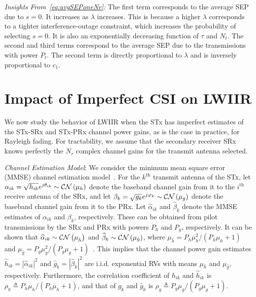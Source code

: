 \documentclass[journal]{IEEEtran}
\newcommand{\CN}{{\cal CN}}
\newcommand{\define}{\triangleq}
\newcommand{\nx}{{0}}
\newcommand{\lam}{\lambda}
\newcommand{\mug}{{\mu_{g}}}
\newcommand{\muh}{{\mu_{h}}}
\newcommand{\Nt}{{N_t}}
\newcommand{\Nr}{{N_r}}
\newcommand{\Pt}{{P_t}}
\newcommand{\such}{h}
\newcommand{\puch}{g}
\newcommand{\hk}[1]{{\such_{#1}}}
\newcommand{\gk}[1]{{\puch_{#1}}}
\newcommand{\itau}{\tau}
\newcommand{\cone}{c_{1}}
\newcommand{\suchph}{\theta}
\newcommand{\puchph}{\varphi}
\newcommand{\ith}{i^{\text{th}}}
\newcommand{\kth}{k^{\text{th}}}
\newcommand{\sug}{\alpha}
\newcommand{\pug}{\beta}
\newcommand{\sugain}[1]{\sug_{#1}}
\newcommand{\pugain}[1]{\pug_{#1}}
\newcommand{\sugainhat}[1]{\widehat{\sug}_{#1}}
\newcommand{\pugainhat}[1]{\widehat{\pug}_{#1}}
\newcommand{\gpilotpower}{P_g}
\newcommand{\hpilotpower}{P_h}
\newcommand{\hhat}{\hat{\such}}
\newcommand{\ghat}{\hat{\puch}}
\newcommand{\hkhat}[1]{\hhat_{#1}}
\newcommand{\gkhat}[1]{\ghat_{#1}}
\newcommand{\muhhat}{\mu_{\hhat}}
\newcommand{\mughat}{\mu_{\ghat}}
\newcommand{\rhog}{\rho_g}
\newcommand{\rhoh}{\rho_h}
\begin{document}
{\em Insights From~\eqref{eq:avgSEPoneNr}:} The first term corresponds to the average SEP due to $s=\nx$. It increases as $\lam$ increases. This is because a higher $\lam$ corresponds to a tighter interference-outage constraint, which increases the probability of selecting $s=\nx$. It is also an exponentially decreasing function of $\itau$ and $\Nt$. The second and third terms correspond to the average SEP due to the transmissions with power $\Pt$. The second term is directly proportional to $\lam$ and is inversely proportional to $\cone$.
%



\section{Impact of Imperfect CSI on LWIIR}
\label{sec:imperfectcsi}
We now study the behavior of LWIIR when the STx has imperfect estimates of the STx-SRx and STx-PRx channel power gains, as is the case in practice, for Rayleigh fading. For tractability, we assume that the secondary receiver SRx knows perfectly the $\Nr$ complex channel gains for the transmit antenna selected.  


{\em Channel Estimation Model}: We consider the minimum mean square error (MMSE) channel estimation model~\cite{Sboui_2013_TWC,Kashyap_2014_TCOM,musavian_2009_tcom,Zhang_2017_tcom,Kashyap_2015_wicomlet}. For the $\kth$ transmit antenna of the STx, let $ \sugain{ik}= \sqrt{\hk{ik}}e^{j\suchph_{ik}}\sim\CN\left(\muh\right)$ denote the baseband channel gain from it  to the $\ith$ receive antenna of the SRx, and let $\pugain{k} = \sqrt{\gk{k}}e^{j\puchph_{k}}\sim\CN\left(\mug\right)$ denote the baseband channel gain from it to the PRx. Let $\sugainhat{ik}$ and $\pugainhat{k}$ denote the MMSE estimates of $\sugain{ik}$ and $\pugain{k}$, respectively. These can be obtained from pilot transmissions by the SRx and PRx with powers $\hpilotpower$ and $\gpilotpower$, respectively.  It can be shown that  $\sugainhat{ik}\sim\CN\left(\muhhat \right)$ and $\pugainhat{k}\sim \CN\left(\mughat\right)$, where  $\muhhat ={\hpilotpower\mu^2_{\such}}/{\left( \hpilotpower\muh+1\right)}$ and $\mughat = {\gpilotpower\mu^2_{\puch}}/{\left( \gpilotpower\mug+1\right)}$~\cite{Kashyap_2014_TCOM}.  
This implies that the channel power gain estimates $\hkhat{ik}=|\sugainhat{ik}|^2$ and $\gkhat{k}=|\pugainhat{k}|^2$ are i.i.d. exponential RVs with means $\muhhat$ and $\mughat$, respectively. Furthermore, the correlation coefficient  of  $\hk{ik}$ and $\hkhat{ik}$ is $\rhoh\define{\hpilotpower\muh}/{\left( \hpilotpower\muh + 1\right) }$, and that of $\gk{k}$ and $\gkhat{k}$ is $\rhog \define{\gpilotpower\mug}/{\left( \gpilotpower\mug + 1\right) }$. 
\end{document}
